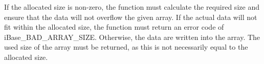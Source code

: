 If the allocated size is non-zero, the function must calculate the
required size and ensure that the data will not overflow the given
array. If the actual data will not fit within the allocated size, the
function must return an error code of iBase\_BAD\_ARRAY\_SIZE.
Otherwise, the data are written into the array. The used size of the
array must be returned, as this is not necessarily equal to the
allocated size.

